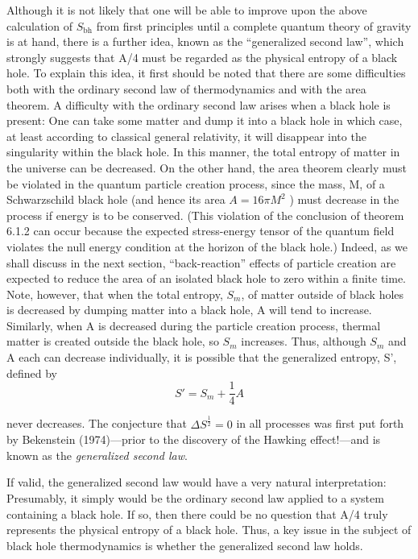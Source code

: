 \documentclass[11pt,a4paper]{article}
\begin{document}
Although it is not likely that one will be able to improve upon the above calculation of \(S_{\mathrm{bh}}\) from first principles until a complete quantum theory of gravity is at hand, there is a further idea, known as the ``generalized second law'', which strongly suggests that A/4 must be regarded as the physical entropy of a black hole. To explain this idea, it first should be noted that there are some difficulties both with the ordinary second law of thermodynamics and with the area theorem. A difficulty with the ordinary second law arises when a black hole is present: One can take some matter and dump it into a black hole in which case, at least according to classical general relativity, it will disappear into the singularity within the black hole. In this manner, the total entropy of matter in the universe can be decreased. On the other hand, the area theorem clearly must be violated in the quantum particle creation process, since the mass, M, of a Schwarzschild black hole (and hence its area \(A = 16\pi M^2\) ) must decrease in the process if energy is to be conserved. (This violation of the conclusion of theorem 6.1.2 can occur because the expected stress-energy tensor of the quantum field violates the null energy condition at the horizon of the black hole.) Indeed, as we shall discuss in the next section, ``back-reaction'' effects of particle creation are expected to reduce the area of an isolated black hole to zero within a finite time. Note, however, that when the total entropy, \(S_m\), of matter outside of black holes is decreased by dumping matter into a black hole, A will tend to increase. Similarly, when A is decreased during the particle creation process, thermal matter is created outside the black hole, so \(S_m\) increases. Thus, although \(S_m\) and A each can decrease individually, it is possible that the generalized entropy, S', defined by
\begin{equation*}
S' = S_m + \frac{1}{4}A \tag{7.2.5}\label{eq:7.2.5}
\end{equation*}

never decreases. The conjecture that \(\Delta S^{\frac{1}{2}} = 0\) in all processes was first put forth by Bekenstein (1974)---prior to the discovery of the Hawking effect!---and is known as the \emph{generalized second law}.

If valid, the generalized second law would have a very natural interpretation: Presumably, it simply would be the ordinary second law applied to a system containing a black hole. If so, then there could be no question that A/4 truly represents the physical entropy of a black hole. Thus, a key issue in the subject of black hole thermodynamics\hypertarget{source-180}{} is whether the generalized second law holds.
\end{document}
